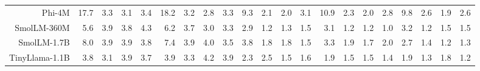 \begin{table}[t]
{\begin{tabular}{rrrrr|rrrr|rrrr|rrrr|rrrr}
Phi-4M & \cellcolor[HTML]{CCE8CC}17.7 & \cellcolor[HTML]{FAD6CC}3.3 & \cellcolor[HTML]{FAD6CC}3.1 & \cellcolor[HTML]{FAD7CC}3.4 & \cellcolor[HTML]{CCE8CC}18.2 & \cellcolor[HTML]{FAD6CC}3.2 & \cellcolor[HTML]{F9D4CC}2.8 & \cellcolor[HTML]{FAD6CC}3.3 & \cellcolor[HTML]{CCE8CC}9.3 & \cellcolor[HTML]{FAD9CC}2.1 & \cellcolor[HTML]{FAD7CC}2.0 & \cellcolor[HTML]{FCE1CC}3.1 & \cellcolor[HTML]{CCE8CC}10.9 & \cellcolor[HTML]{FBDBCC}2.3 & \cellcolor[HTML]{FAD8CC}2.0 & \cellcolor[HTML]{FBDFCC}2.8 & \cellcolor[HTML]{CCE8CC}9.8 & \cellcolor[HTML]{FBDECC}2.6 & \cellcolor[HTML]{FAD8CC}1.9 & \cellcolor[HTML]{FBDECC}2.6 \\
SmolLM-360M & \cellcolor[HTML]{FCE1CC}5.6 & \cellcolor[HTML]{FAD9CC}3.9 & \cellcolor[HTML]{FAD9CC}3.8 & \cellcolor[HTML]{FBDBCC}4.3 & \cellcolor[HTML]{FCE3CC}6.2 & \cellcolor[HTML]{FAD8CC}3.7 & \cellcolor[HTML]{FAD5CC}3.0 & \cellcolor[HTML]{FAD6CC}3.3 & \cellcolor[HTML]{FCE0CC}2.9 & \cellcolor[HTML]{F9D1CC}1.2 & \cellcolor[HTML]{F9D1CC}1.3 & \cellcolor[HTML]{F9D4CC}1.5 & \cellcolor[HTML]{FCE1CC}3.1 & \cellcolor[HTML]{F9D3CC}1.2 & \cellcolor[HTML]{F9D3CC}1.2 & \cellcolor[HTML]{F9D2CC}1.0 & \cellcolor[HTML]{FCE3CC}3.2 & \cellcolor[HTML]{F9D3CC}1.2 & \cellcolor[HTML]{FAD5CC}1.5 & \cellcolor[HTML]{FAD5CC}1.5 \\
SmolLM-1.7B & \cellcolor[HTML]{FEECCC}8.0 & \cellcolor[HTML]{FAD9CC}3.9 & \cellcolor[HTML]{FAD9CC}3.9 & \cellcolor[HTML]{FAD9CC}3.8 & \cellcolor[HTML]{FDE8CC}7.4 & \cellcolor[HTML]{FAD9CC}3.9 & \cellcolor[HTML]{FAD9CC}4.0 & \cellcolor[HTML]{FAD7CC}3.5 & \cellcolor[HTML]{FDE7CC}3.8 & \cellcolor[HTML]{FAD5CC}1.8 & \cellcolor[HTML]{FAD6CC}1.8 & \cellcolor[HTML]{F9D3CC}1.5 & \cellcolor[HTML]{FCE2CC}3.3 & \cellcolor[HTML]{FAD8CC}1.9 & \cellcolor[HTML]{FAD6CC}1.7 & \cellcolor[HTML]{FAD9CC}2.0 & \cellcolor[HTML]{FBDFCC}2.7 & \cellcolor[HTML]{F9D4CC}1.4 & \cellcolor[HTML]{F9D3CC}1.2 & \cellcolor[HTML]{F9D3CC}1.3 \\
TinyLlama-1.1B & \cellcolor[HTML]{FAD9CC}3.8 & \cellcolor[HTML]{FAD6CC}3.1 & \cellcolor[HTML]{FAD9CC}3.9 & \cellcolor[HTML]{FAD8CC}3.7 & \cellcolor[HTML]{FAD9CC}3.9 & \cellcolor[HTML]{FAD6CC}3.3 & \cellcolor[HTML]{FBDACC}4.2 & \cellcolor[HTML]{FAD9CC}3.9 & \cellcolor[HTML]{FBDBCC}2.3 & \cellcolor[HTML]{FBDCCC}2.5 & \cellcolor[HTML]{F9D3CC}1.5 & \cellcolor[HTML]{F9D4CC}1.6 & \cellcolor[HTML]{FAD8CC}1.9 & \cellcolor[HTML]{FAD5CC}1.5 & \cellcolor[HTML]{FAD5CC}1.5 & \cellcolor[HTML]{FAD4CC}1.4 & \cellcolor[HTML]{FAD8CC}1.9 & \cellcolor[HTML]{F9D4CC}1.3 & \cellcolor[HTML]{FAD8CC}1.8 & \cellcolor[HTML]{F9D3CC}1.2 \\

\end{tabular}}
\end{table}
